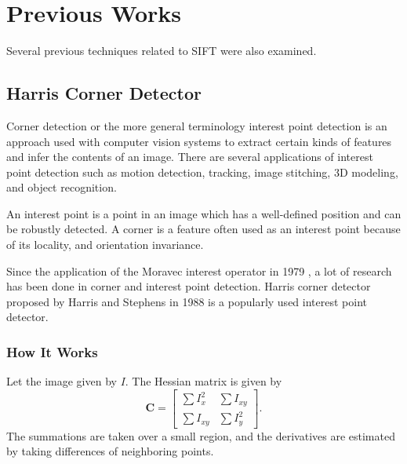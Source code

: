 \documentclass{article}
\begin{document}
\section{Previous Works}\label{S:survey}

Several previous techniques related to SIFT were also examined. 

\subsection{Harris Corner Detector}\label{SS:Harris}


Corner detection or the more general terminology interest point detection is an approach used with computer vision systems to extract certain kinds of features and infer the contents of an image. 
There are several applications of interest point detection such as motion detection, tracking, image stitching, 3D modeling, and object recognition. 

An interest point is a point in an image which has a well-defined position and can be robustly detected. 
A corner is a feature often used as an interest point because of its locality, and orientation invariance. 

Since the application of the Moravec interest operator in 1979 \cite{hMoravec79}, a lot of research has been done in corner and interest point detection. 
Harris corner detector \cite{cHarris88} proposed by Harris and Stephens in 1988 is a popularly used interest point detector. 



\subsubsection{How It Works}

Let the image given by $ I $. The Hessian matrix is given by 
\begin{equation}
  \mathbf{C} = \begin{bmatrix}
    \sum I_{x}^2 & \sum I_{xy}\\
    \sum I_{xy} & \sum I_{y}^2
  \end{bmatrix}.
\end{equation}
The summations are taken over a small region, and the derivatives are estimated by taking differences of neighboring points. 
\end{document}
